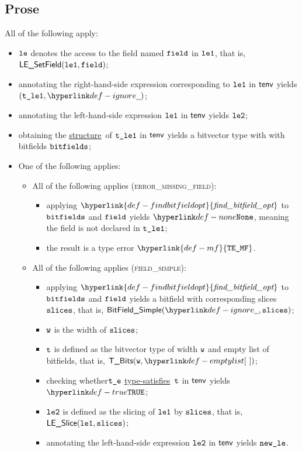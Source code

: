 \documentclass{book}
\newcommand\ProseOrTypeError[0]{\ProseTerminateAs{\TypeErrorConfig}}
\newcommand\findbitfieldopt[0]{\hyperlink{def-findbitfieldopt}{\textfunc{find\_bitfield\_opt}}}
\newcommand\structure[0]{\hyperlink{def-structure}{structure}}
\newcommand\typesatisfies[0]{\hyperlink{def-typesatisfies}{type-satisfies}}
\newcommand\TypeErrorCode[1]{\texttt{TE\_#1}}
\newcommand\MissingField[0]{\hyperlink{def-mf}{\TypeErrorCode{MF}}}
\begin{document}
\subsection{Prose}
All of the following apply:
\begin{itemize}
  \item $\texttt{le}$ denotes the access to the field named $\texttt{field}$ in $\texttt{le1}$, that is, \\ $\textsf{LE\_SetField}(\texttt{le1}, \texttt{field})$;
  \item annotating the right-hand-side expression corresponding to $\texttt{le1}$ in $\textsf{tenv}$ yields \\ $(\vtleone, \Ignore)$\ProseOrTypeError;
  \item annotating the left-hand-side expression $\texttt{le1}$ in $\textsf{tenv}$ yields $\texttt{le2}$\ProseOrTypeError;
  \item obtaining the \structure\ of $\texttt{t\_le1}$ in $\textsf{tenv}$ yields a bitvector type with with bitfields $\texttt{bitfields}$\ProseOrTypeError;
  \item One of the following applies:
  \begin{itemize}
    \item All of the following applies (\textsc{error\_missing\_field}):
    \begin{itemize}
      \item applying $\findbitfieldopt$ to $\texttt{bitfields}$ and $\texttt{field}$ yields $\None$, meaning the field is not declared
            in $\texttt{t\_le1}$;
      \item the result is a type error $\MissingField$.
    \end{itemize}

    \item All of the following applies (\textsc{field\_simple}):
    \begin{itemize}
      \item applying $\findbitfieldopt$ to $\texttt{bitfields}$ and $\texttt{field}$ yields a bitfield with corresponding slices $\texttt{slices}$,
            that is, $\BitFieldSimple(\Ignore, \slices)$;
      \item $\texttt{w}$ is the width of $\texttt{slices}$;
      \item $\texttt{t}$ is defined as the bitvector type of width $\texttt{w}$ and empty list of bitfields, that is, $\TBits(\vw, \emptylist)$;
      \item checking whether$\texttt{t\_e}$ \typesatisfies\ $\texttt{t}$ in $\textsf{tenv}$ yields $\True$\ProseOrTypeError;
      \item $\texttt{le2}$ is defined as the slicing of $\texttt{le1}$ by $\texttt{slices}$, that is, \\ $\textsf{LE\_Slice}(\texttt{le1}, \texttt{slices})$;
      \item annotating the left-hand-side expression $\texttt{le2}$ in $\textsf{tenv}$ yields $\texttt{new\_le}$\ProseOrTypeError.
    \end{itemize}


\end{itemize}
\end{itemize}
\end{document}

